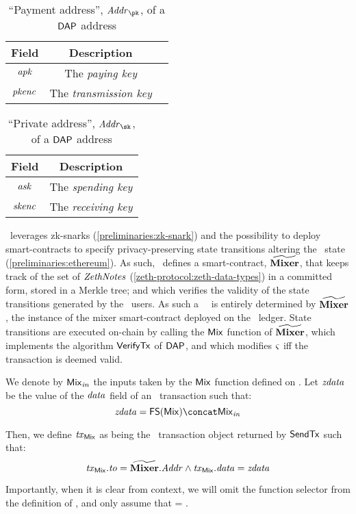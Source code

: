 \begin{table}[H]
\centering
\begin{tabular}{ccc}
    Field           & Description\\ \toprule
    $\mathit{apk}$        & The \emph{paying key}\\ \midrule
    $\mathit{pkenc}$      & The \emph{transmission key}\\\bottomrule
\end{tabular}
\caption{``Payment address'', $\addr_\pk$, of a $\mathsf{DAP}$ address}\label{preliminaries:tab:dap-payaddr}
\end{table}

\begin{table}[H]
\centering
\begin{tabular}{cc}
    Field           & Description\\ \toprule
    $\mathit{ask}$        & The \emph{spending key}\\ \midrule
    $\mathit{skenc}$      & The \emph{receiving key}\\\bottomrule
\end{tabular}
\caption{``Private address'', $\addr_\sk$, of a $\mathsf{DAP}$ address}\label{preliminaries:tab:dap-privaddr}
\end{table}

\zeth~leverages zk-snarks (\cref{preliminaries:zk-snark}) and the possibility to deploy smart-contracts to specify privacy-preserving state transitions altering the \ethereum~state \wstate (\cref{preliminaries:ethereum}).
As such, \zeth~defines a smart-contract, $\widetilde{\mathbf{Mixer}}$, that keeps track of the set of $\mathit{ZethNotes}$ (\cref{zeth-protocol:zeth-data-types}) in a committed form, stored in a Merkle tree; and which verifies the validity of the state transitions generated by the \zeth~users. As such a \zeth~\dapscheme~is entirely determined by $\widetilde{\mathbf{Mixer}}$, the instance of the mixer smart-contract deployed on the \ethereum~ledger.
State transitions are executed on-chain by calling the $\mathsf{Mix}$ function of $\widetilde{\mathbf{Mixer}}$, which implements the algorithm $\mathsf{VerifyTx}$ of $\mathsf{DAP}$, and which modifies $\mathit{\varsigma}$ iff the transaction is deemed valid.

\begin{notebox}
We denote by $\mathit{{\mathsf{Mix}}_{in}}$ the inputs taken by the $\mathsf{Mix}$ function defined on \mixer. Let $\mathit{zdata}$ be the value of the $\mathit{data}$ field of an \ethereum~transaction such that:
\[
    \zdata = \funcSelec{\mix} \concat \inp{\mix}
\]

Then, we define $\mathit{tx}_{\mathsf{Mix}}$ as being the \ethereum~transaction object returned by $\mathsf{SendTx}$ such that:
\[
    \mathit{tx}_{\mathsf{Mix}}.\mathit{to} = \widetilde{\mathbf{Mixer}}.\mathit{Addr} \land \mathit{tx}_{\mathsf{Mix}}.\mathit{data} = \mathit{zdata}
\]

Importantly, when it is clear from context, we will omit the function selector from the definition of \zdata, and only assume that \zdata = \inp{\mix}.
\end{notebox}
